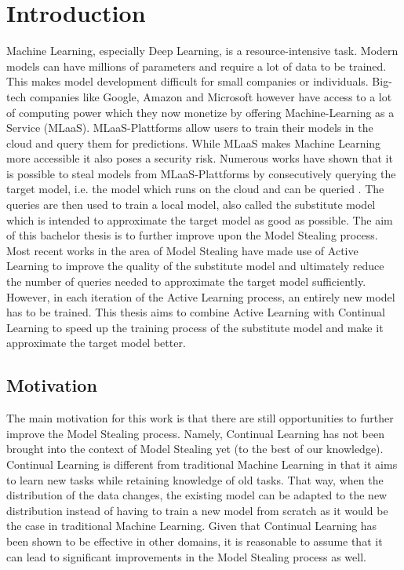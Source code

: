 \documentclass[expose, en]{thesis}
\begin{document}
\maketitle


\section{Introduction}
Machine Learning, especially Deep Learning, is a resource-intensive task. Modern models can have millions of parameters
 and require a lot of data to be trained. This makes model development difficult for small companies or individuals.
 Big-tech companies like Google, Amazon and Microsoft however have access to a lot of computing power which they
 now monetize by offering Machine-Learning as a Service (MLaaS). MLaaS-Plattforms allow users to train their models in the cloud
 and query them for predictions. While MLaaS makes Machine Learning more accessible it also poses a security risk. Numerous works
 have shown that it is possible to steal models from MLaaS-Plattforms by consecutively querying the target model, i.e. the model which 
 runs on the cloud and can be queried \cite{tramer2016stealing} \cite{reith2019efficiently}. The queries are then used to train a local model, also called the substitute model which is
 intended to approximate the target model as good as possible.
 The aim of this bachelor thesis is to further improve upon the Model Stealing process. Most recent works in the area of Model Stealing
 have made use of Active Learning to improve the quality of the substitute model and ultimately reduce the number of queries needed to approximate
 the target model sufficiently. However, in each iteration of the Active Learning process, an entirely new model has to be trained. This thesis aims to
 combine Active Learning with Continual Learning to speed up the training process of the substitute model and make it approximate the target model
 better.
\subsection{Motivation}
The main motivation for this work is that there are still opportunities to further improve the Model Stealing process.
Namely, Continual Learning has not been brought into the context of Model Stealing yet (to the best of our knowledge).
Continual Learning is different from traditional Machine Learning in that it aims to learn new tasks while retaining knowledge
of old tasks. That way, when the distribution of the data changes, the existing model can be adapted to the new distribution
instead of having to train a new model from scratch as it would be the case in traditional Machine Learning.
Given that Continual Learning has been shown to be effective in other domains, it is reasonable to assume that it can
lead to significant improvements in the Model Stealing process as well.
\end{document}
